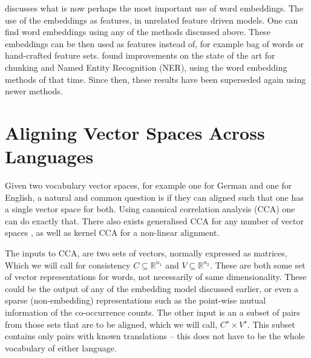 \documentclass[parskip]{komatufte}
\begin{document}

 discusses what is now perhaps the most important use of word embeddings.
The use of the embeddings as features, in unrelated feature driven models.
One can find word embeddings using any of the methods discussed above.
These embeddings can be then used as features instead of, for example bag of words or hand-crafted feature sets.
\textcite{turian2010word} found improvements on the state of the art for chunking and Named Entity Recognition (NER), using the word embedding methods of that time.
Since then, these results have been superseded again using newer methods.


\section{Aligning Vector Spaces Across Languages}
Given two vocabulary vector spaces, for example one for German and one for English,
a natural and common question is if they can aligned such that one has a single vector space for both.
Using canonical correlation analysis (CCA) one can do exactly that.
There also exists generalised CCA for any number of vector spaces ,
as well as kernel CCA for a non-linear alignment.

The inputs to CCA, are two sets of vectors, normally expressed as matrices,
Which we will call for consistency $C \subseteq \mathbb{R}^{n_1}$ and $V \subseteq \mathbb{R}^{n_2}$.
These are both some set of vector representations for words, not necessarily of same dimensionality.
These could be the output of any of the embedding model discussed earlier,
or even a sparse (non-embedding) representations such as the point-wise mutual information of the co-occurrence counts.
The other input is an a subset of pairs from those sets that are to be aligned, which we will call, $C^\star \times V^\star$.
This subset contains only pairs with known translations -- this does not have to be the whole vocabulary of either language.
\end{document}
